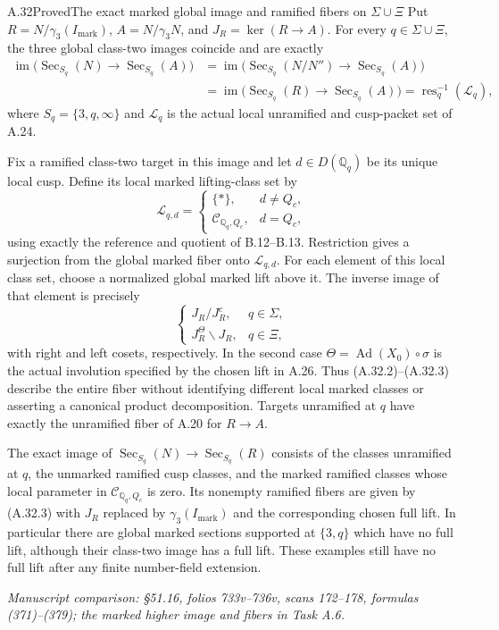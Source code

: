 \begin{statement}{A.32}{Proved}{The exact marked global image and ramified fibers on $\Sigma\cup\Xi$}
Put
$R=N/\gamma_3(I_{\mathrm{mark}})$,
$A=N/\gamma_3N$, and
$J_R=\ker(R\to A)$.
For every $q\in\Sigma\cup\Xi$,
the three global class-two images
coincide and are exactly
\[
 \begin{split}
 \operatorname{im}\bigl(\operatorname{Sec}_{S_q}(N)
                                   \to\operatorname{Sec}_{S_q}(A)\bigr)
 &=\operatorname{im}\bigl(\operatorname{Sec}_{S_q}(N/N'')
                                   \to\operatorname{Sec}_{S_q}(A)\bigr)\\
 &=\operatorname{im}\bigl(\operatorname{Sec}_{S_q}(R)
                                   \to\operatorname{Sec}_{S_q}(A)\bigr)
   =\operatorname{res}_q^{-1}(\mathscr L_q),
 \end{split}
 \tag{A.32.1}
\]
where $S_q=\{3,q,\infty\}$ and
$\mathscr L_q$ is the actual local
unramified and cusp-packet set of A.24.

Fix a ramified class-two target in
this image and let $d\in D(\mathbb Q_q)$
be its unique local cusp. Define its
local marked lifting-class set by
\[
 \mathcal L_{q,d}=
 \begin{cases}
  \{*\},&d\ne Q_c,\\
  \mathcal C_{\mathbb Q_q,Q_c},&d=Q_c,
 \end{cases}
 \tag{A.32.2}
\]
using exactly the reference and
quotient of B.12--B.13.
Restriction gives a surjection from
the global marked fiber onto
$\mathcal L_{q,d}$.
For each element of this local
class set, choose a normalized
global marked lift above it.
The inverse image of that element
is precisely
\[
 \begin{cases}
 J_R/J_R^c,&q\in\Sigma,\\
 J_R^\Theta\backslash J_R,&q\in\Xi,
 \end{cases}
 \tag{A.32.3}
\]
with right and left cosets,
respectively. In the second case
$\Theta=\operatorname{Ad}(X_0)\circ\sigma$
is the actual involution specified
by the chosen lift in A.26.
Thus (A.32.2)--(A.32.3) describe
the entire fiber without identifying
different local marked classes or
asserting a canonical product
decomposition. Targets unramified
at $q$ have exactly the unramified
fiber of A.20 for $R\to A$.

The exact image of
$\operatorname{Sec}_{S_q}(N)\to
\operatorname{Sec}_{S_q}(R)$ consists
of the classes unramified at $q$,
the unmarked ramified cusp classes,
and the marked ramified classes
whose local parameter in
$\mathcal C_{\mathbb Q_q,Q_c}$ is zero.
Its nonempty ramified fibers are
given by (A.32.3) with
$J_R$ replaced by
$\gamma_3(I_{\mathrm{mark}})$ and
the corresponding chosen full lift.
In particular there are global
marked sections supported at
$\{3,q\}$ which have no full lift,
although their class-two image
has a full lift. These examples
still have no full lift after
any finite number-field extension.
\par\smallskip\noindent\emph{Manuscript comparison: \S51.16,
folios 733v--736v, scans 172--178, formulas (371)--(379);
the marked higher image and fibers in Task A.6.}
\end{statement}
